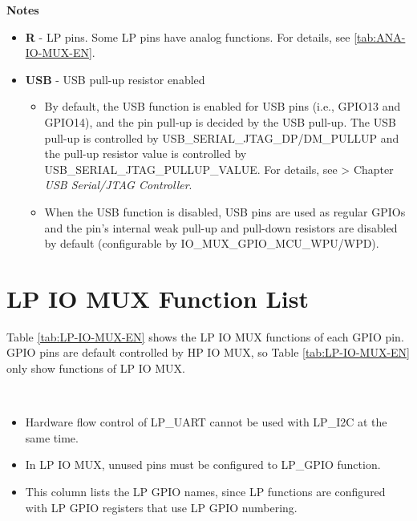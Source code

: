 \documentclass[main\_\_EN.tex]{subfiles}
\begin{document}
    \textbf{Notes}

    \begin{itemize}
        \item \textbf{R} - LP pins. Some LP pins have analog functions. For details, see \ref{tab:ANA-IO-MUX-EN}.
\item \textbf{USB} - USB pull-up resistor enabled
\begin{itemize}
    \item By default, the USB function is enabled for USB pins (i.e., GPIO13 and GPIO14), and the pin pull-up is decided by the USB pull-up. The USB pull-up is controlled by USB\_SERIAL\_JTAG\_DP/DM\_PULLUP and the pull-up resistor value is controlled by USB\_SERIAL\_JTAG\_PULLUP\_VALUE. For details, see  > Chapter \textit{USB Serial/JTAG Controller}.
    \item When the USB function is disabled, USB pins are used as regular GPIOs and the pin's internal weak pull-up and pull-down resistors are disabled by default (configurable by IO\_MUX\_GPIO\_MCU\_WPU/WPD).
    \end{itemize}
 \end{itemize}

\section{LP IO MUX Function List}
\label{sec:lp_iomux_pads}
Table \ref{tab:LP-IO-MUX-EN} shows the LP IO MUX functions of each GPIO pin. GPIO pins are default controlled by HP IO MUX, so Table \ref{tab:LP-IO-MUX-EN} only show functions of LP IO MUX.



\tableheaderLPFunctionsEN
\tablecontentLPFunctions

\begin{importantlisting}\\
    \vspace{-2em}
    \begin{itemize}
        \item Hardware flow control of LP\_UART cannot be used with LP\_I2C at the same time.
        \item In LP IO MUX, unused pins must be configured to LP\_GPIO function.
        \item This column lists the LP GPIO names, since LP functions are configured with LP GPIO registers that use LP GPIO numbering.
    \end{itemize}
\end{importantlisting}
\end{document}

